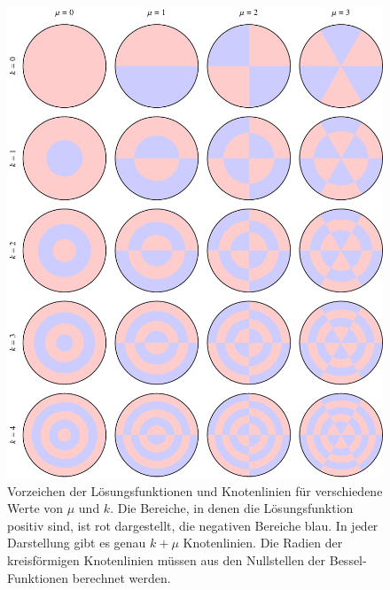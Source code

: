 \begin{figure}
\centering
\includegraphics[width=\textwidth]{chapters/090-pde/bessel/pauke.pdf}
\caption{Vorzeichen der Lösungsfunktionen und Knotenlinien
für verschiedene Werte von $\mu$ und $k$.
Die Bereiche, in denen die Lösungsfunktion positiv sind, ist 
rot dargestellt, die negativen Bereiche blau.
In jeder Darstellung gibt es genau $k+\mu$ Knotenlinien.
Die Radien der kreisförmigen Knotenlinien müssen aus den Nullstellen
der Bessel-Funktionen berechnet werden.
\label{buch:pde:kreis:fig:pauke}}
\end{figure}
